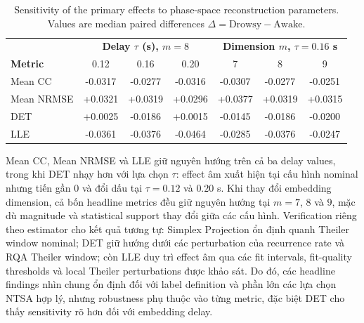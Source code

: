 \begin{table}[t]
\centering
\caption{Sensitivity of the primary effects to phase-space reconstruction parameters. Values are median paired differences $\Delta=\mathrm{Drowsy}-\mathrm{Awake}$.}
\label{tab:parameter_sensitivity}
\footnotesize
\setlength{\tabcolsep}{3.5pt}
\renewcommand{\arraystretch}{1.08}
\begin{tabular}{lccc|ccc}
\toprule
& \multicolumn{3}{c}{\textbf{Delay $\tau$ (s), $m=8$}}
& \multicolumn{3}{c}{\textbf{Dimension $m$, $\tau=0.16$ s}} \\
\textbf{Metric}
& 0.12 & 0.16 & 0.20
& 7 & 8 & 9 \\
\midrule
Mean CC
& -0.0317 & -0.0277 & -0.0316
& -0.0307 & -0.0277 & -0.0251 \\
Mean NRMSE
& +0.0321 & +0.0319 & +0.0296
& +0.0377 & +0.0319 & +0.0315 \\
DET
& +0.0025 & -0.0186 & +0.0015
& -0.0145 & -0.0186 & -0.0200 \\
LLE
& -0.0361 & -0.0376 & -0.0464
& -0.0285 & -0.0376 & -0.0247 \\
\bottomrule
\end{tabular}
\end{table}

Mean CC, Mean NRMSE và LLE giữ nguyên hướng trên cả ba delay values, trong khi DET nhạy hơn với lựa chọn $\tau$: effect âm xuất hiện tại cấu hình nominal nhưng tiến gần 0 và đổi dấu tại $\tau=0.12$ và $0.20$ s. Khi thay đổi embedding dimension, cả bốn headline metrics đều giữ nguyên hướng tại $m=7$, $8$ và $9$, mặc dù magnitude và statistical support thay đổi giữa các cấu hình. Verification riêng theo estimator cho kết quả tương tự: Simplex Projection ổn định quanh Theiler window nominal; DET giữ hướng dưới các perturbation của recurrence rate và RQA Theiler window; còn LLE duy trì effect âm qua các fit intervals, fit-quality thresholds và local Theiler perturbations được khảo sát. Do đó, các headline findings nhìn chung ổn định đối với label definition và phần lớn các lựa chọn NTSA hợp lý, nhưng robustness phụ thuộc vào từng metric, đặc biệt DET cho thấy sensitivity rõ hơn đối với embedding delay.
